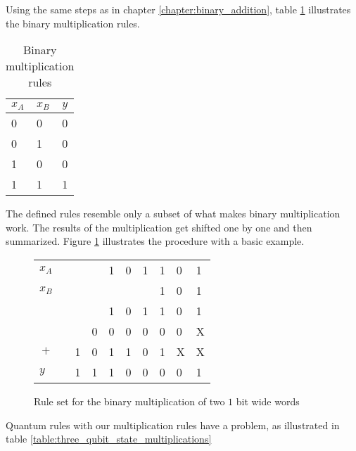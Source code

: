 Using the same steps as in chapter \ref{chapter:binary_addition}, table \ref{table:binary_multiplication_rules} illustrates the binary multiplication rules.

\begin{table}[!h]
\centering
\begin{tabular}{|l|l|l|}
\hline
$x_A$ & $x_B$ & $y$ \\ \hline
0     & 0     & 0   \\ \hline
0     & 1     & 0   \\ \hline
1     & 0     & 0   \\ \hline
1     & 1     & 1   \\ \hline
\end{tabular}
\caption{Binary multiplication rules}
\label{table:binary_multiplication_rules}
\end{table}

The defined rules resemble only a subset of what makes binary multiplication work. The results of the multiplication get shifted one by one and then summarized. Figure \ref{figure:binary_multiplication_example} illustrates the procedure with a basic example.

\begin{figure}[!h]
\centering
\begin{tabular}{clllccllll}
$x_A$                   &  &   &   & 1                     & 0                     & 1 & 1 & 0 & 1 \\
$x_B$                   &  &   &   &                       &                       &   & 1 & 0 & 1 \\ \hline
                        &  &   &   & 1                     & 0                     & 1 & 1 & 0 & 1 \\
                        &  &   & 0 & 0                     & 0                     & 0 & 0 & 0 & X \\
$+$                     &  & 1 & 0 & 1                     & 1                     & 0 & 1 & X & X \\ \hline
\multicolumn{1}{l}{$y$} &  & 1 & 1 & \multicolumn{1}{l}{1} & \multicolumn{1}{l}{0} & 0 & 0 & 0 & 1
\end{tabular}
\caption{Rule set for the binary multiplication of two $1$ bit wide words}
\label{figure:binary_multiplication_example}
\end{figure}

Quantum rules with our multiplication rules have a problem, as illustrated in table \ref{table:three_qubit_state_multiplications}

